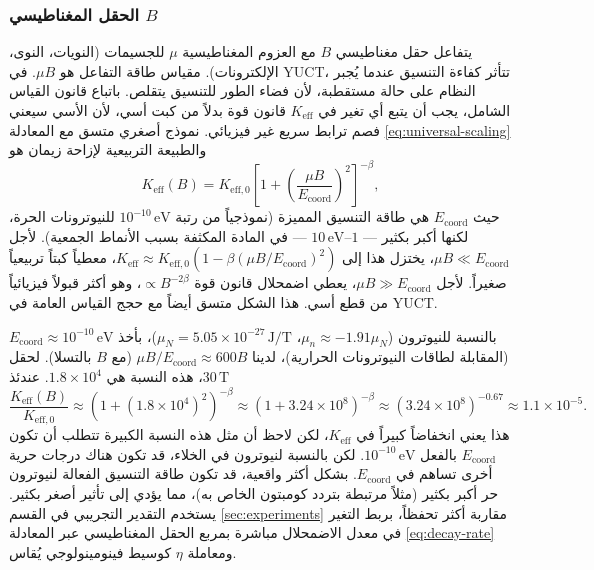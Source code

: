 \documentclass[11pt,a4paper]{article}
\newcommand{\Keff}{K_{\mathrm{eff}}}
\newcommand{\Keffzero}{K_{\mathrm{eff},0}}
\theoremstyle{remark}
\begin{document}
	\subsubsection{الحقل المغناطيسي \(B\)}
	
	يتفاعل حقل مغناطيسي \(B\) مع العزوم المغناطيسية \(\mu\) للجسيمات (النويات، النوى، الإلكترونات). مقياس طاقة التفاعل هو \(\mu B\). في YUCT، تتأثر كفاءة التنسيق عندما يُجبر النظام على حالة مستقطبة، لأن فضاء الطور للتنسيق يتقلص. باتباع قانون القياس الشامل، يجب أن يتبع أي تغير في \(\Keff\) قانون قوة بدلاً من كبت أسي، لأن الأسي سيعني فصم ترابط سريع غير فيزيائي. نموذج أصغري متسق مع المعادلة \eqref{eq:universal-scaling} والطبيعة التربيعية لإزاحة زيمان هو
	\begin{equation}
		\Keff(B) = \Keffzero \left[ 1 + \left( \frac{\mu B}{E_{\mathrm{coord}}} \right)^2 \right]^{-\beta},
		\label{eq:keff-B}
	\end{equation}
	حيث \(E_{\mathrm{coord}}\) هي طاقة التنسيق المميزة (نموذجياً من رتبة \(10^{-10}\,\text{eV}\) للنيوترونات الحرة، لكنها أكبر بكثير — \(1\)–\(10\,\text{eV}\) — في المادة المكثفة بسبب الأنماط الجمعية). لأجل \(\mu B \ll E_{\mathrm{coord}}\)، يختزل هذا إلى \(\Keff \approx \Keffzero (1 - \beta (\mu B/E_{\mathrm{coord}})^2)\)، معطياً كبتاً تربيعياً صغيراً. لأجل \(\mu B \gg E_{\mathrm{coord}}\)، يعطي اضمحلال قانون قوة \(\propto B^{-2\beta}\)، وهو أكثر قبولاً فيزيائياً من قطع أسي. هذا الشكل متسق أيضاً مع حجج القياس العامة في YUCT.
	
	بالنسبة للنيوترون (\(\mu_n \approx -1.91\mu_N\)، \(\mu_N = 5.05\times 10^{-27}\,\text{J/T}\))، بأخذ \(E_{\mathrm{coord}} \approx 10^{-10}\,\text{eV}\) (المقابلة لطاقات النيوترونات الحرارية)، لدينا \(\mu B / E_{\mathrm{coord}} \approx 600 B\) (مع \(B\) بالتسلا). لحقل \(30\,\text{T}\)، هذه النسبة هي \(1.8\times10^4\). عندئذ
	\[
	\frac{\Keff(B)}{\Keffzero} \approx (1 + (1.8\times10^4)^2)^{-\beta} \approx (1 + 3.24\times10^8)^{-\beta} \approx (3.24\times10^8)^{-0.67} \approx 1.1\times10^{-5}.
	\]
	هذا يعني انخفاضاً كبيراً في \(\Keff\)، لكن لاحظ أن مثل هذه النسبة الكبيرة تتطلب أن تكون \(E_{\mathrm{coord}}\) بالفعل \(10^{-10}\,\text{eV}\). لكن بالنسبة لنيوترون في الخلاء، قد تكون هناك درجات حرية أخرى تساهم في \(E_{\mathrm{coord}}\). بشكل أكثر واقعية، قد تكون طاقة التنسيق الفعالة لنيوترون حر أكبر بكثير (مثلاً مرتبطة بتردد كومبتون الخاص به)، مما يؤدي إلى تأثير أصغر بكثير. يستخدم التقدير التجريبي في القسم \ref{sec:experiments} مقاربة أكثر تحفظاً، بربط التغير في معدل الاضمحلال مباشرة بمربع الحقل المغناطيسي عبر المعادلة \eqref{eq:decay-rate} ومعاملة \(\eta\) كوسيط فينومينولوجي يُقاس.
	
\end{document}
